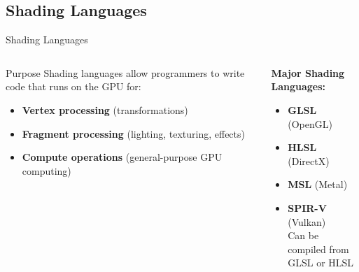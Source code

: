 \subsection{Shading Languages}
\begin{frame}{Shading Languages}
  \begin{columns}
    \begin{column}{0.6\textwidth}
      \begin{conceptbox}{Purpose}
        Shading languages allow programmers to write code that runs on the GPU for:
        \begin{itemize}
          \item \textbf{Vertex processing} (transformations)
          \item \textbf{Fragment processing} (lighting, texturing, effects)
          \item \textbf{Compute operations} (general-purpose GPU computing)
        \end{itemize}
      \end{conceptbox}
    \end{column}
    \begin{column}{0.4\textwidth}
      \small
      \textbf{Major Shading Languages:}
      \begin{itemize}
        \item \textcolor{PrimaryColor}{\textbf{GLSL}} (OpenGL)
        \item \textcolor{SecondaryColor}{\textbf{HLSL}} (DirectX)
        \item \textcolor{ObjectColor}{\textbf{MSL}} (Metal)
        \item \textcolor{AccentColor}{\textbf{SPIR-V}} (Vulkan) \\
          {\footnotesize Can be compiled from \\ GLSL or HLSL}
      \end{itemize}
    \end{column}
  \end{columns}
\end{frame}

